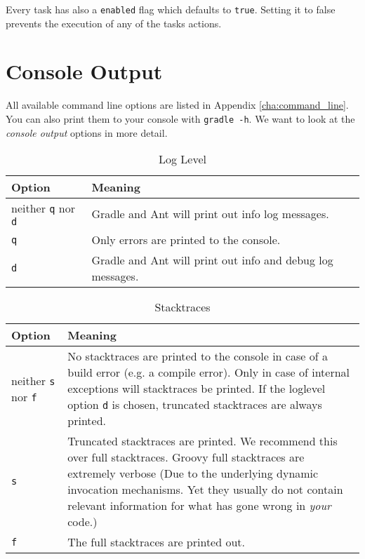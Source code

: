 Every task has also a \texttt{enabled} flag which defaults to \texttt{true}. Setting it to false prevents the execution of any of the tasks actions.

\section{Console Output}
All available command line options are listed in Appendix \ref{cha:command_line}. You can also print them to your console with \texttt{gradle -h}. We want to look at the \emph{console output} options in more detail. 

\begin{table}
	\begin{center}
    \begin{tabular}{|l|l|} \hline
    Option & Meaning  \\ \hline
    neither \texttt{q} nor \texttt{d} & Gradle and Ant will print out info log messages.  \\ \hline
    \texttt{q} & Only errors are printed to the console.  \\ \hline
    \texttt{d} & Gradle and Ant will print out info and debug log messages. \\ \hline
    \end{tabular}
	\end{center}
	\caption{Log Level}
\end{table}

\begin{table}
	\begin{center}
    \begin{tabular}{|l|p{15cm}|} \hline
    Option & Meaning  \\ \hline
    neither \texttt{s} nor \texttt{f} & No stacktraces are printed to the console in case of a build error (e.g. a compile error). Only in case of internal exceptions will stacktraces be printed. If the loglevel option \texttt{d} is chosen, truncated stacktraces are always printed. \\ \hline
    \texttt{s} & Truncated stacktraces are printed. We recommend this over full stacktraces. Groovy full stacktraces are extremely verbose (Due to the underlying dynamic invocation mechanisms. Yet they usually do not contain relevant information for what has gone wrong in \emph{your} code.)  \\ \hline
    \texttt{f} & The full stacktraces are printed out. \\ \hline
    \end{tabular}
	\end{center}
	\caption{Stacktraces}
\end{table}

